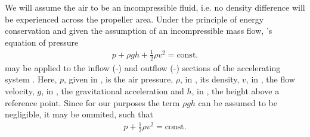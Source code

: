 We will assume the air to be an incompressible fluid, i.e. no density difference will be experienced across the propeller area. 
Under the principle of energy conservation and given the assumption of an incompressible mass flow, 's equation of pressure
%
\begin{align}
p + \rho g h + \frac{1}{2}\rho v^2 = \text{const.}
\end{align}
%
may be applied to the inflow (-) and outflow (-) sections of the accelerating system \cite{seddon2002}.
Here, $p$, given in \withunit{\newton\per\square\metre}, is the air pressure, 
$\rho$, in \withunit{\kilo\gram\per\cubic\metre}, its density,
$v$, in \withunit{\metre\per\second}, the flow velocity,
$g$, in , the gravitational acceleration and
$h$, in \withunit{\metre}, the height above a reference point.
%
%
Since for our purposes the term $\rho g h$ can be assumed to be negligible, it may be ommited, such that
%
\begin{align}
p + \frac{1}{2} \rho v^2 = \text{const.} \label{eq:bernoulli}
\end{align}

